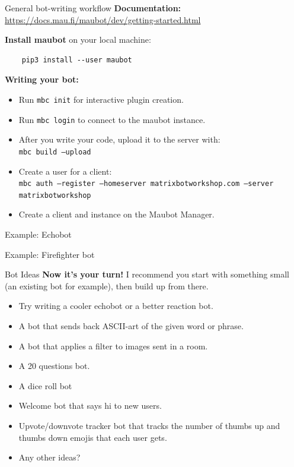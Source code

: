 \documentclass{beeper}
\begin{document}
\begin{frame}[fragile]{General bot-writing workflow}
    \textbf{Documentation:}
    \url{https://docs.mau.fi/maubot/dev/getting-started.html}

    \bigskip

    \textbf{Install maubot} on your local machine:
    \begin{verbatim}
    pip3 install --user maubot
    \end{verbatim}

    \textbf{Writing your bot:}
    \begin{itemize}
        \item Run \texttt{mbc init} for interactive plugin creation.
        \item Run \texttt{mbc login} to connect to the maubot instance.
        \item After you write your code, upload it to the server with: \\
            \texttt{mbc build --upload}
        \item Create a user for a client: \\
            \texttt{mbc auth --register --homeserver matrixbotworkshop.com --server matrixbotworkshop}
        \item Create a client and instance on the Maubot Manager.
    \end{itemize}
\end{frame}

\begin{frame}[standout]
    \Huge
    Example: Echobot
\end{frame}

\begin{frame}[standout]
    \Huge
    Example: Firefighter bot
\end{frame}

\begin{frame}{Bot Ideas}
    \textbf{Now it's your turn!} I recommend you start with something small (an
    existing bot for example), then build up from there.

    \begin{itemize}
        \item Try writing a cooler echobot or a better reaction bot.
        \item A bot that sends back ASCII-art of the given word or phrase.
        \item A bot that applies a filter to images sent in a room.
        \item A 20 questions bot.
        \item A dice roll bot
        \item Welcome bot that says hi to new users.
        \item Upvote/downvote tracker bot that tracks the number of thumbs up
            and thumbs down emojis that each user gets.
        \item Any other ideas?
    \end{itemize}
\end{frame}
\end{document}
